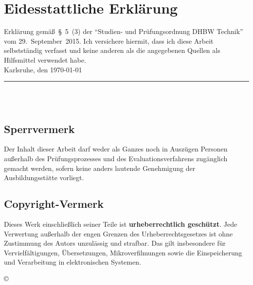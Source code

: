 \chapter*{Eidesstattliche Erklärung}

Erklärung gemäß~§~5~(3) der "`Studien- und Prüfungsordnung DHBW Technik"' vom 29.~September~2015. Ich versichere hiermit, dass ich diese Arbeit selbstständig verfasst und keine anderen als die angegebenen Quellen als Hilfsmittel verwendet habe.\\[4ex]

\noindent Karlsruhe, den \today \\[8ex]
\noindent \rule{5cm}{0.5pt} \\
\noindent \autor\\

\section*{Sperrvermerk}

Der Inhalt dieser Arbeit darf weder als Ganzes noch in Auszügen Personen außerhalb des Prüfungsprozesses und des Evaluationsverfahrens zugänglich gemacht werden, sofern keine anders lautende Genehmigung der Ausbildungsstätte vorliegt.

\section*{Copyright-Vermerk}

Dieses Werk einschließlich seiner Teile ist \textbf{urheberrechtlich geschützt}. Jede Verwertung außerhalb der engen Grenzen des Urheberrechtsgesetzes ist ohne Zustimmung des Autors unzulässig und strafbar. Das gilt insbesondere für Vervielfältigungen, Übersetzungen, Mikroverfilmungen sowie die Einspeicherung und Verarbeitung in elektronischen Systemen.

\begin{flushright}
    \copyright{} \jahr
\end{flushright}

\clearpage
